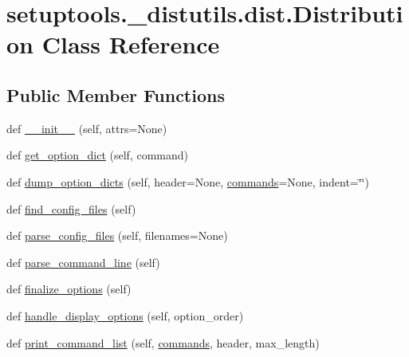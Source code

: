 \hypertarget{classsetuptools_1_1__distutils_1_1dist_1_1Distribution}{}\section{setuptools.\+\_\+distutils.\+dist.\+Distribution Class Reference}
\label{classsetuptools_1_1__distutils_1_1dist_1_1Distribution}
\subsection*{Public Member Functions}
\begin{DoxyCompactItemize}
\item 
def \hyperlink{classsetuptools_1_1__distutils_1_1dist_1_1Distribution_a0094099b63f82cdff60b30ef26b1c9b0}{\+\_\+\+\_\+init\+\_\+\+\_\+} (self, attrs=None)
\item 
def \hyperlink{classsetuptools_1_1__distutils_1_1dist_1_1Distribution_acc19458816eb97768561cd08f2fba634}{get\+\_\+option\+\_\+dict} (self, command)
\item 
def \hyperlink{classsetuptools_1_1__distutils_1_1dist_1_1Distribution_a76af842d8a4797dd21e8274d34a00151}{dump\+\_\+option\+\_\+dicts} (self, header=None, \hyperlink{classsetuptools_1_1__distutils_1_1dist_1_1Distribution_ad050adfe72c00b4c0069922348aac9c5}{commands}=None, indent=\char`\"{}\char`\"{})
\item 
def \hyperlink{classsetuptools_1_1__distutils_1_1dist_1_1Distribution_a414ba1a6430be50fe242b1d353e173d0}{find\+\_\+config\+\_\+files} (self)
\item 
def \hyperlink{classsetuptools_1_1__distutils_1_1dist_1_1Distribution_aef1afa2f30e403b98643588817549d29}{parse\+\_\+config\+\_\+files} (self, filenames=None)
\item 
def \hyperlink{classsetuptools_1_1__distutils_1_1dist_1_1Distribution_a7bc65336d5a3689cfd0185929618c512}{parse\+\_\+command\+\_\+line} (self)
\item 
def \hyperlink{classsetuptools_1_1__distutils_1_1dist_1_1Distribution_aeaa7469b2b846ff288490d6ffd9df933}{finalize\+\_\+options} (self)
\item 
def \hyperlink{classsetuptools_1_1__distutils_1_1dist_1_1Distribution_a72a03ee3bafac26f10ca3e3470c91d59}{handle\+\_\+display\+\_\+options} (self, option\+\_\+order)
\item 
def \hyperlink{classsetuptools_1_1__distutils_1_1dist_1_1Distribution_a71d112e0e1ce0730be31fd1085e72386}{print\+\_\+command\+\_\+list} (self, \hyperlink{classsetuptools_1_1__distutils_1_1dist_1_1Distribution_ad050adfe72c00b4c0069922348aac9c5}{commands}, header, max\+\_\+length)

\end{DoxyCompactItemize}

